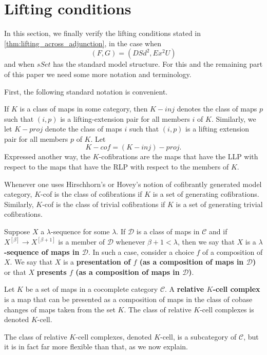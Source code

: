 
\section{Lifting conditions}
\label{sec:lifting}


In this section, we finally verify the lifting conditions stated in \cref{thm:lifting_across_adjunction}, in the case when
\[(F,G)=(DSd^2,Ex^2U)\]
and when $sSet$ has the standard model structure. For this and the remaining part of this paper we need some more notation and terminology.

First, the following standard notation is convenient.
\begin{notation}\label{not:injectives_projectives_cofibrations_relations}
If $K$ is a class of maps in some category, then $K-inj$ denotes the class of maps $p$ such that $(i,p)$ is a lifting-extension pair for all members $i$ of $K$. Similarly, we let $K-proj$ denote the class of maps $i$ such that $(i,p)$ is a lifting extension pair for all members $p$ of $K$. Let
\[K-cof=(K-inj)-proj.\]
Expressed another way, the $K$-cofibrations are the maps that have the LLP with respect to the maps that have the RLP with respect to the members of $K$.
\end{notation}
\noindent Whenever one uses Hirschhorn's or Hovey's notion of cofibrantly generated model category, $K$-cof is the class of cofibrations if $K$ is a set of generating cofibrations. Similarly, $K$-cof is the class of trivial cofibrations if $K$ is a set of generating trivial cofibrations.

Suppose $X$ a $\lambda$-sequence for some $\lambda$. If $\mathscr{D}$ is a class of maps in $\mathscr{C}$ and if $X^{[\beta ]}\to X^{[\beta +1]}$ is a member of $\mathscr{D}$ whenever $\beta +1<\lambda$, then we say that $X$ is a \textbf{$\lambda$-sequence of maps in $\mathscr{D}$}. In such a case, consider a choice $f$ of a composition of $X$. We say that $X$ is a \textbf{presentation of $f$ (as a composition of maps in $\mathscr{D}$)} or that $X$ \textbf{presents $f$ (as a composition of maps in $\mathscr{D}$)}.
\begin{definition}\label{def:relative_cell_complex}
Let $K$ be a set of maps in a cocomplete category $\mathscr{C}$. A \textbf{relative $K$-cell complex} is a map that can be presented as a composition of maps in the class of cobase changes of maps taken from the set $K$. The class of relative $K$-cell complexes is denoted $K$-cell.
\end{definition}
\noindent The class of relative $K$-cell complexes, denoted $K$-cell, is a subcategory of $\mathscr{C}$, but it is in fact far more flexible than that, as we now explain.

